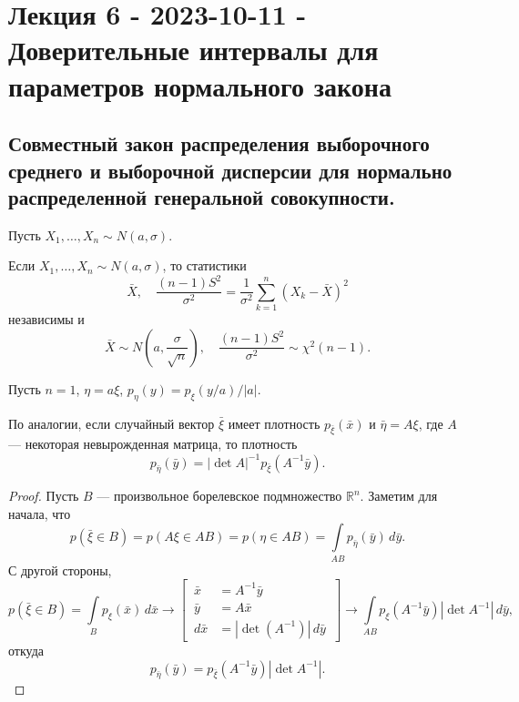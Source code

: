 \section{Лекция 6 - 2023-10-11 - Доверительные интервалы для параметров
нормального закона} \label{sec:lec6}
\subsection{Совместный закон распределения выборочного среднего и выборочной
дисперсии для нормально распределенной генеральной совокупности.}

Пусть $X_1, \dots, X_n \sim N(a, \sigma)$.

\begin{theorem}
	\label{the:1}
  Если $X_1, \dots, X_n \sim N(a, \sigma)$, то статистики
\[
	\bar X,\quad \frac{(n-1) S^2}{\sigma^2} = \frac{1}{\sigma^2} \sum\limits_{k=1}^n (X_k-\bar X)^2
\]
	независимы и
	\[
		\bar X \sim N\left(a, \frac{\sigma}{\sqrt{n}}\right),\quad \frac{(n-1)
		S^2}{\sigma^2} \sim \chi^2(n-1).
	\]
\end{theorem}

  Пусть $n = 1$, $\eta = a \xi$, $p_\eta(y) = p_\xi(y/a)/|a| $.
\begin{lemma}
  По аналогии, если случайный вектор $ \bar \xi $ имеет плотность $p_{\bar \xi}
	(\bar x)$ и $\bar\eta = A\xi$, где $ A $ --- некоторая невырожденная матрица, то 
	плотность
	\[
		p_{\bar\eta} (\bar y) = |\det A|^{-1} p_{\bar\xi} (A^{-1} \bar y).
	\]
\end{lemma}
\begin{proof}
	Пусть $ B $ --- произвольное борелевское подмножество $ \mathbb R^n $. Заметим
	для начала, что
  \[
		p(\bar\xi \in B) = p(A\xi \in AB) = p(\eta \in AB) = \int\limits_{AB}
		p_{\bar\eta}(\bar y)\,d\bar y.
	\]
	С другой стороны,
  \[ 
		p(\bar \xi \in B) = \int\limits_B p_\xi (\bar x) \, d\bar x
  \to \left[\, \begin{aligned}
    \bar x &= A^{-1} \bar y \\
    \bar y &= A \bar x \\
    d\bar x &= |\det(A^{-1})| \,d\bar y
\end{aligned} \,\right] \to 
  \int\limits_{AB} p_\xi(A^{-1} \bar y) |\det A^{-1}|\, d\bar y ,
\]
откуда  
\[
		p_{\bar \eta} (\bar y)
  = p_{\bar\xi} (A^{-1} \bar y) |\det A^{-1}|.
\]

\end{proof}


